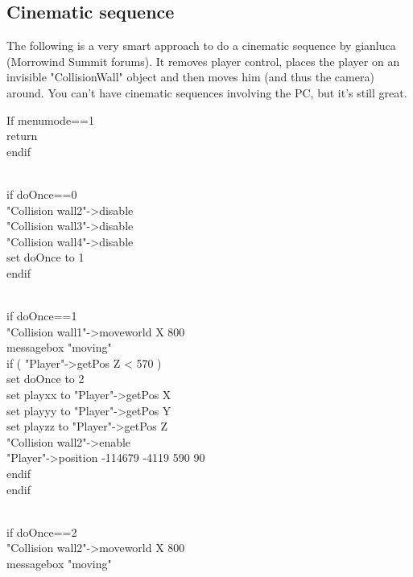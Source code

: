 

\hypertarget{cinematic-sequence}{%
\subsection{\texorpdfstring{\hfill\break
Cinematic sequence}{ Cinematic sequence}}\label{cinematic-sequence}}

The following is a very smart approach to do a cinematic sequence by
gianluca (Morrowind Summit forums). It removes player control, places
the player on an invisible "CollisionWall" object and then moves him
(and thus the camera) around. You can't have cinematic sequences
involving the PC, but it's still great.

If menumode==1\\
return\\
endif\\
\strut \\
if doOnce==0\\
"Collision wall2"-\textgreater disable\\
"Collision wall3"-\textgreater disable\\
"Collision wall4"-\textgreater disable\\
set doOnce to 1\\
endif\\
\strut \\
if doOnce==1\\
"Collision wall1"-\textgreater moveworld X 800\\
messagebox "moving"\\
if ( "Player"-\textgreater getPos Z \textless{} 570 )\\
set doOnce to 2\\
set playxx to "Player"-\textgreater getPos X\\
set playyy to "Player"-\textgreater getPos Y\\
set playzz to "Player"-\textgreater getPos Z\\
"Collision wall2"-\textgreater enable\\
"Player"-\textgreater position -114679 -4119 590 90\\
endif\\
endif\\
\strut \\
if doOnce==2\\
"Collision wall2"-\textgreater moveworld X 800\\
messagebox "moving"\\
